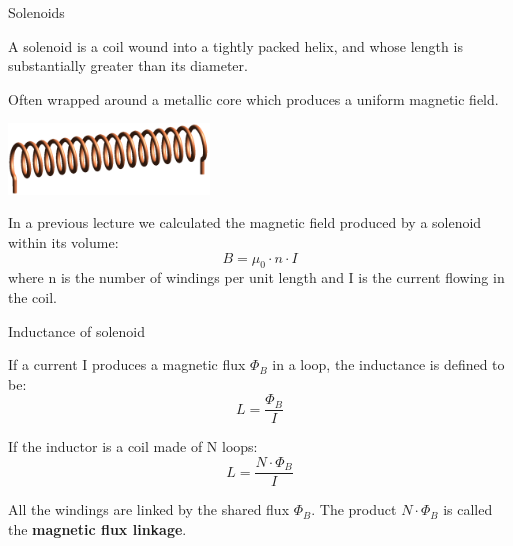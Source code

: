 %
%
%

\begin{frame}{Solenoids}

A solenoid is a coil wound into a tightly packed helix,
and whose length is substantially greater than its diameter.\\
\begin{itemize}
{\small
   \item Often wrapped around a metallic core which produces a uniform magnetic field.
}
\end{itemize}

\begin{center}
  \includegraphics[width=0.40\textwidth]{./images/schematics/solenoid_1.png}\\
\end{center}

In a previous lecture we calculated the magnetic field produced
by a solenoid within its volume:
\begin{equation*}
   B = \mu_0 \cdot n \cdot I
\end{equation*}
where n is the number of windings per unit length and I is the current flowing in the coil.

\end{frame}

%
%
%

\begin{frame}{Inductance of solenoid}

If a current I produces a magnetic flux $\Phi_B$ in a loop, the inductance is defined to be:
\begin{equation*}
  L = \frac{\Phi_B}{I}
\end{equation*}

If the inductor is a coil made of N loops:
\begin{equation*}
  L = \frac{N \cdot \Phi_B}{I}
\end{equation*}

All the windings are linked by the shared flux $\Phi_B$.
The product $N \cdot \Phi_B$ is called the {\bf magnetic flux linkage}.

\end{frame}

%
%
%

